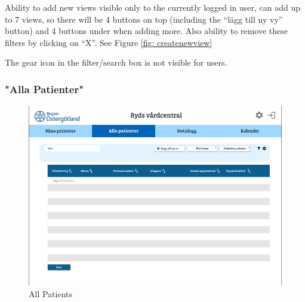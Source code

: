 \documentclass{scrreprt}
\begin{document}
Ability to add new views visible only to the currently logged in user, can add up to 7 views, so there will be 4 buttons on top (including the “lägg till ny vy” button) and 4 buttons under when adding more. Also ability to remove these filters by clicking on “X”. See Figure \ref{fig: createnewview}

The gear icon in the filter/search box is not visible for users.


\clearpage

\subsubsection{"Alla Patienter"}
\begin{figure}[h!]
    \centering
    \includegraphics[width=15cm]{allpat.png}
    \caption{All Patients}
    \label{fig: allpat}
\end{figure}
\end{document}
